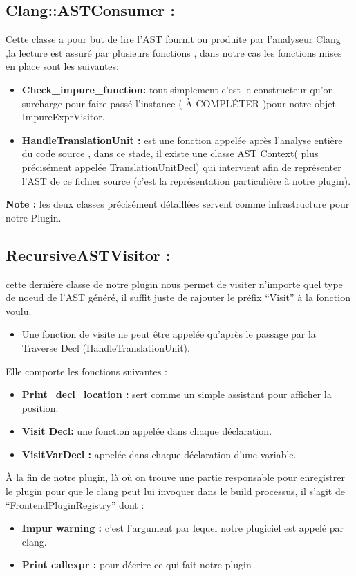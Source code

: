 \documentclass[12pt,titlepage]{article}
\begin{document}
\subsection{Clang::ASTConsumer :}

Cette  classe a pour but de lire l’AST fournit ou produite par l’analyseur Clang ,la lecture est assuré par plusieurs fonctions , dans notre cas les fonctions mises en place sont les suivantes:
\begin{itemize}
\item \textbf{Check\_impure\_function:} tout simplement c’est le constructeur qu’on surcharge pour faire passé l’instance ( À COMPLÉTER )pour notre objet ImpureExprVisitor.

\item \textbf{HandleTranslationUnit :} est une fonction appelée après l’analyse entière du code source , dans ce stade, il existe une classe AST Context( plus précisément appelée TranslationUnitDecl) qui intervient afin de représenter l’AST de ce fichier source (c’est la représentation particulière à notre plugin).
\end{itemize}

\textbf{Note : }les deux classes précisément détaillées servent comme infrastructure pour notre Plugin.


\subsection{RecursiveASTVisitor :}

cette dernière classe de notre plugin nous permet de visiter n’importe quel type de noeud de l’AST généré, il suffit juste de rajouter le préfix “Visit” à la fonction voulu.
\begin{itemize}
\item Une fonction de visite ne peut être appelée qu’après le passage par la Traverse Decl (HandleTranslationUnit).
\end{itemize}
Elle comporte les fonctions suivantes :
\begin{itemize}
\item \textbf{Print\_decl\_location :} sert comme un simple assistant pour afficher la position.
\item \textbf{Visit Decl:} une fonction appelée dans chaque déclaration.
\item \textbf{VisitVarDecl :} appelée dans chaque déclaration d’une variable.
\end{itemize}

À la fin de notre plugin, là où on trouve une partie responsable pour enregistrer le plugin pour que le clang peut lui invoquer dans le build processus, il s’agit de “FrontendPluginRegistry” dont :
\begin{itemize}
\item \textbf{Impur warning : }c’est l’argument par lequel notre plugiciel est appelé par clang.
\item \textbf{Print callexpr :} pour décrire ce qui fait notre plugin .
\end{itemize}
\end{document}
